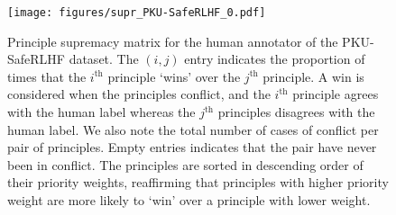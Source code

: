 \documentclass{article}
\begin{document}
\begin{figure}
    \centering
    \texttt{[image: figures/supr\_PKU-SafeRLHF\_0.pdf]}
    \caption{Principle supremacy matrix for the human annotator of the PKU-SafeRLHF dataset. The $(i, j)$ entry indicates the proportion of times that the $i^{\text{th}}$ principle `wins' over the $j^{\text{th}}$ principle. A win is considered when the principles conflict, and the $i^{\text{th}}$ principle agrees with the human label whereas the $j^{\text{th}}$ principles disagrees with the human label. We also note the total number of cases of conflict per pair of principles. Empty entries indicates that the pair have never been in conflict. The principles are sorted in descending order of their priority weights, reaffirming that principles with higher priority weight are more likely to `win' over a principle with lower weight.}
    \label{fig:supremacy-pku}
\end{figure}
\end{document}
